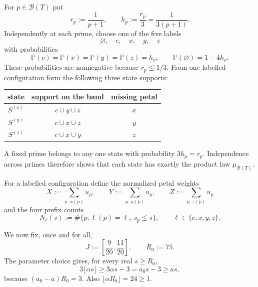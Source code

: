 \documentclass[11pt]{article}
\numberwithin{equation}{section}
\theoremstyle{plain}
\newcommand{\Pp}{\mathbb P}
\newcommand{\1}{\mathbf 1}
\newcommand{\cB}{\mathcal B}
\begin{document}
For $p\in\cB(T)$ put
\[
 r_p:=\frac1{p+1},
 \qquad
 h_p:=\frac{r_p}{3}=\frac1{3(p+1)}.
\]
Independently at each prime, choose one of the five labels
\[
 \varnothing,\quad c,\quad x,\quad y,\quad z
\]
with probabilities
\begin{equation}\label{eq:five-state-law}
 \Pp(c)=\Pp(x)=\Pp(y)=\Pp(z)=h_p,
 \qquad
 \Pp(\varnothing)=1-4h_p.
\end{equation}
These probabilities are nonnegative because $r_p\le1/3$.  From one labelled
configuration form the following three state supports:
\begin{center}
\begin{tabular}{c c c}
\toprule
state & support on the band & missing petal\\
\midrule
$S^{(x)}$ & $c\cup y\cup z$ & $x$\\
$S^{(y)}$ & $c\cup x\cup z$ & $y$\\
$S^{(z)}$ & $c\cup x\cup y$ & $z$\\
\bottomrule
\end{tabular}
\end{center}
A fixed prime belongs to any one state with probability $3h_p=r_p$.
Independence across primes therefore shows that each state has exactly the
product law $\mu_{\cB(T)}$.

For a labelled configuration define the normalized petal weights
\begin{equation}\label{eq:petal-weights}
 X:=\sum_{p:\,x(p)}u_p,\qquad
 Y:=\sum_{p:\,y(p)}u_p,\qquad
 Z:=\sum_{p:\,z(p)}u_p
\end{equation}
and the four prefix counts
\begin{equation}\label{eq:label-counts}
 N_\ell(s):=\#\{p:\ell(p)=\ell,\ s_p\le s\},
 \qquad \ell\in\{c,x,y,z\}.
\end{equation}

We now fix, once and for all,
\begin{equation}\label{eq:fixed-window-depth}
 J:=\left[\frac9{20},\frac{11}{20}\right],
 \qquad R_0:=75.
\end{equation}
The parameter choice gives, for every real $s\ge R_0$,
\begin{equation}\label{eq:profile-dominates}
 3\lfloor\alpha s\rfloor
 \ge3\alpha s-3=a_0s-3\ge as,
\end{equation}
because $(a_0-a)R_0=3$.  Also
$\lfloor\alpha R_0\rfloor=24\ge1$.
\end{document}
